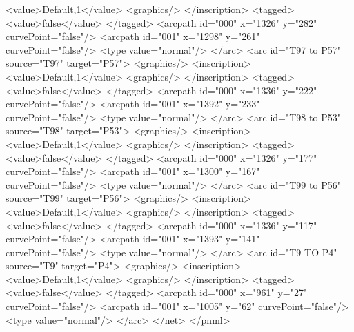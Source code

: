 <value>Default,1</value>
<graphics/>
</inscription>
<tagged>
<value>false</value>
</tagged>
<arcpath id="000" x="1326" y="282" curvePoint="false"/>
<arcpath id="001" x="1298" y="261" curvePoint="false"/>
<type value="normal"/>
</arc>
<arc id="T97 to P57" source="T97" target="P57">
<graphics/>
<inscription>
<value>Default,1</value>
<graphics/>
</inscription>
<tagged>
<value>false</value>
</tagged>
<arcpath id="000" x="1336" y="222" curvePoint="false"/>
<arcpath id="001" x="1392" y="233" curvePoint="false"/>
<type value="normal"/>
</arc>
<arc id="T98 to P53" source="T98" target="P53">
<graphics/>
<inscription>
<value>Default,1</value>
<graphics/>
</inscription>
<tagged>
<value>false</value>
</tagged>
<arcpath id="000" x="1326" y="177" curvePoint="false"/>
<arcpath id="001" x="1300" y="167" curvePoint="false"/>
<type value="normal"/>
</arc>
<arc id="T99 to P56" source="T99" target="P56">
<graphics/>
<inscription>
<value>Default,1</value>
<graphics/>
</inscription>
<tagged>
<value>false</value>
</tagged>
<arcpath id="000" x="1336" y="117" curvePoint="false"/>
<arcpath id="001" x="1393" y="141" curvePoint="false"/>
<type value="normal"/>
</arc>
<arc id="T9 TO P4" source="T9" target="P4">
<graphics/>
<inscription>
<value>Default,1</value>
<graphics/>
</inscription>
<tagged>
<value>false</value>
</tagged>
<arcpath id="000" x="961" y="27" curvePoint="false"/>
<arcpath id="001" x="1005" y="62" curvePoint="false"/>
<type value="normal"/>
</arc>
</net>
</pnml>
